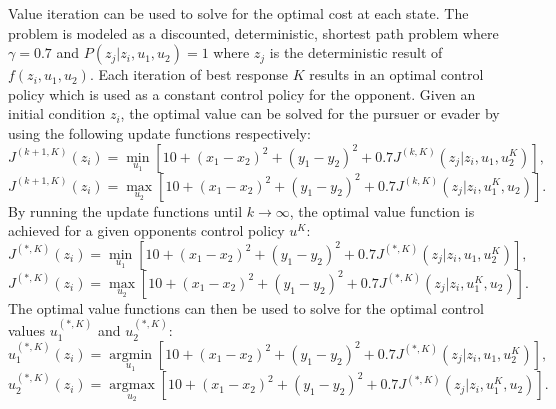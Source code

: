 Value iteration can be used to solve for the optimal cost at each state. The problem is modeled as a discounted, deterministic, shortest path problem where $\gamma = 0.7$ and $P(z_j|z_i,u_1,u_2) = 1$ where $z_j$ is the deterministic result of $f(z_i,u_1,u_2)$. Each iteration of best response $K$ results in an optimal control policy which is used as a constant control policy for the opponent. Given an initial condition $z_i$, the optimal value can be solved for the pursuer or evader by using the following update functions respectively:
\begin{equation}\label{4pbell}
J^{(k+1,K)}(z_i)= \underset{u_1 }{\operatorname{min }}[10+(x_1-x_2)^2+(y_1-y_2)^2+0.7 J^{(k,K)}(z_j|z_i,u_1,u_2^K)],
\end{equation}
\begin{equation}\label{4ebell}
J^{(k+1,K)}(z_i)= \underset{u_2 }{\operatorname{max }}[10+(x_1-x_2)^2+(y_1-y_2)^2+0.7 J^{(k,K)}(z_j|z_i,u_1^K,u_2)].
\end{equation} 
By running the update functions until $k \rightarrow \infty$, the optimal value function is achieved for a given opponents control policy $u^K$:
\begin{equation}\label{4popt}
J^{(*,K)}(z_i)= \underset{u_1 }{\operatorname{min }}[10+(x_1-x_2)^2+(y_1-y_2)^2+0.7 J^{(*,K)}(z_j|z_i,u_1,u_2^K)],
\end{equation}
\begin{equation}\label{4eopt}
J^{(*,K)}(z_i)= \underset{u_2 }{\operatorname{max }}[10+(x_1-x_2)^2+(y_1-y_2)^2+0.7 J^{(*,K)}(z_j|z_i,u_1^K,u_2)].
\end{equation}
The optimal value functions can then be used to solve for the optimal control values $u_1^{(*,K)}$ and $u_2^{(*,K)}$:
\begin{equation}\label{4pcont}
u_1^{(*,K)}(z_i)= \underset{u_1 }{\operatorname{arg min }}[10+(x_1-x_2)^2+(y_1-y_2)^2+0.7 J^{(*,K)}(z_j|z_i,u_1,u_2^K)],
\end{equation}
\begin{equation}\label{4econt}
u_2^{(*,K)}(z_i)= \underset{u_2 }{\operatorname{arg max }}[10+(x_1-x_2)^2+(y_1-y_2)^2+0.7 J^{(*,K)}(z_j|z_i,u_1^K,u_2)].
\end{equation}

